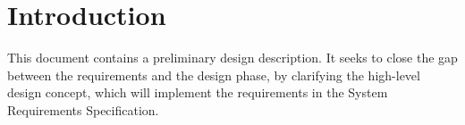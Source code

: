 \chapter{Introduction}
This document contains a preliminary design description. It seeks to close the gap between the requirements and the design phase, by clarifying the high-level design concept, which will implement the requirements in the System Requirements Specification. 
